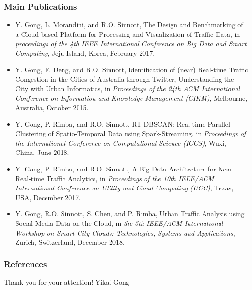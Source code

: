 \begin{frame}[plain]
    \frametitle{Main Publications}
    \begin{itemize} \tiny
	    \item Y. Gong, L. Morandini, and R.O. Sinnott, The Design and Benchmarking of a Cloud-based Platform for Processing and Visualization of Traffic Data, in \emph{proceedings of the 4th IEEE International Conference on Big Data and Smart Computing}, Jeju Island, Korea, February 2017.
	    \item Y. Gong, F. Deng, and R.O. Sinnott, Identification of (near) Real-time Traffic Congestion in the Cities of Australia through Twitter, Understanding the City with Urban Informatics, in \emph{Proceedings of the 24th ACM International Conference on Information and Knowledge Management (CIKM)}, Melbourne, Australia, October 2015.
	    \item Y. Gong, P. Rimba, and R.O. Sinnott, RT-DBSCAN: Real-time Parallel Clustering of Spatio-Temporal Data using Spark-Streaming, in \emph{Proceedings of the International Conference on Computational Science (ICCS)}, Wuxi, China, June 2018.
	    \item Y. Gong, P. Rimba, and R.O. Sinnott, A Big Data Architecture for Near Real-time Traffic Analytics, in \emph{Proceedings of the 10th IEEE/ACM International Conference on Utility and Cloud Computing (UCC)}, Texas, USA, December 2017.
        \item Y. Gong, R.O. Sinnott, S. Chen, and P. Rimba, Urban Traffic Analysis using Social Media Data on the Cloud, in \emph{the 5th IEEE/ACM International Workshop on Smart City Clouds: Technologies, Systems and Applications}, Zurich, Switzerland, December 2018.
    \end{itemize}
\end{frame}

\begin{frame}[plain]
    \tiny
    \frametitle{References}
    
    
\end{frame}

\begin{frame}[plain]
    \begin{center}
        \Huge Thank you for your attention!
        \vfill
        \Large Yikai Gong
    \end{center}
\end{frame}

